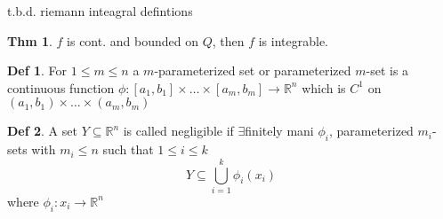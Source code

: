 \documentclass[a4paper, 10pt]{article}
\theoremstyle{definition}
\newtheorem*{theorem}{Thm}
\newtheorem*{definition}{Def}
\theoremstyle{colored}
\theoremstyle{ex}
\theoremstyle{named}
\newcommand{\R}{\mathbb{R}}
\begin{document}
t.b.d. riemann inteagral defintions

\begin{theorem}
    \(f\) is cont. and bounded on \(Q\), then \(f\) is integrable.
\end{theorem}

\begin{definition}
    For \(1 \leq m \leq n\) a \(m\)-parameterized set or parameterized \(m\)-set is a continuous function \(\phi: [a_1, b_1] \times \ldots \times [a_m, b_m] \to \R^n\) which is \(C^1\) on \((a_1, b_1) \times \ldots \times (a_m, b_m)\)
\end{definition}

\begin{definition}
    A set \(Y \subseteq \R^n\) is called negligible if \(\exists\)finitely mani \(\phi_i\), parameterized \(m_i\)-sets with \(m_i \leq n\) such that \(1 \leq i \leq k\)
    \[Y \subseteq \bigcup_{i = 1}^k \phi_i(x_i)\]
    where \(\phi_i: x_i \to \R^n\)
\end{definition}
\end{document}
